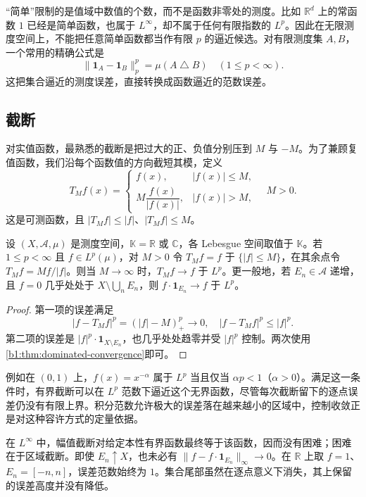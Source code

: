 “简单”限制的是值域中数值的个数，而不是函数非零处的测度。比如 \(\mathbb R^d\) 上的常函数 \(1\) 已经是简单函数，也属于 \(L^\infty\)，却不属于任何有限指数的 \(L^p\)。因此在无限测度空间上，不能把任意简单函数都当作有限 \(p\) 的逼近候选。对有限测度集 \(A,B\)，一个常用的精确公式是
\[
 \|\mathbf1_A-\mathbf1_B\|_p^p
 =\mu(A\mathbin{\triangle}B)\quad(1\leq p<\infty).
\]
这把集合逼近的测度误差，直接转换成函数逼近的范数误差。

\subsection{截断}
\label{b1:subsec:100202}

对实值函数，最熟悉的截断是把过大的正、负值分别压到 \(M\) 与 \(-M\)。为了兼顾复值函数，我们沿每个函数值的方向截短其模，定义
\[
 T_Mf(x)=
 \begin{cases}
 f(x),&|f(x)|\leq M,\\
 M\dfrac{f(x)}{|f(x)|},&|f(x)|>M,
 \end{cases}
 \quad M>0.
\]
这是可测函数，且 \(|T_Mf|\leq|f|\)、\(|T_Mf|\leq M\)。

\begin{proposition}\label{b1:prop:lp-truncation}
设 \((X,\mathcal A,\mu)\) 是测度空间，\(\mathbb K=\mathbb R\) 或 \(\mathbb C\)，各 Lebesgue 空间取值于 \(\mathbb K\)。若 \(1\leq p<\infty\) 且 \(f\in L^p(\mu)\)，对 \(M>0\) 令 \(T_Mf=f\) 于 \(\{|f|\le M\}\)，在其余点令 \(T_Mf=Mf/|f|\)。则当 \(M\to\infty\) 时，\(T_Mf\to f\) 于 \(L^p\)。更一般地，若 \(E_n\in\mathcal A\) 递增，且 \(f=0\) 几乎处处于 \(X\setminus\bigcup_nE_n\)，则 \(f\cdot\mathbf1_{E_n}\to f\) 于 \(L^p\)。
\end{proposition}
\begin{proof}
第一项的误差满足
\[
 |f-T_Mf|^p=(|f|-M)_+^p\longrightarrow0,
 \quad |f-T_Mf|^p\leq|f|^p.
\]
第二项的误差是 \(|f|^p\cdot\mathbf1_{X\setminus E_n}\)，也几乎处处趋零并受 \(|f|^p\) 控制。两次使用\cref{b1:thm:dominated-convergence}即可。
\end{proof}

例如在 \((0,1)\) 上，\(f(x)=x^{-\alpha}\) 属于 \(L^p\) 当且仅当 \(\alpha p<1\)（\(\alpha>0\)）。满足这一条件时，有界截断可以在 \(L^p\) 范数下逼近这个无界函数，尽管每次截断留下的逐点误差仍没有有限上界。积分范数允许极大的误差落在越来越小的区域中，控制收敛正是对这种容许方式的定量依据。

\ProseParagraphBreak

在 \(L^\infty\) 中，幅值截断对给定本性有界函数最终等于该函数，因而没有困难；困难在于区域截断。即使 \(E_n\uparrow X\)，也未必有 \(\|f-f\cdot\mathbf1_{E_n}\|_\infty\to0\)。在 \(\mathbb R\) 上取 \(f=1\)、\(E_n=[-n,n]\)，误差范数始终为 \(1\)。集合尾部虽然在逐点意义下消失，其上保留的误差高度并没有降低。


